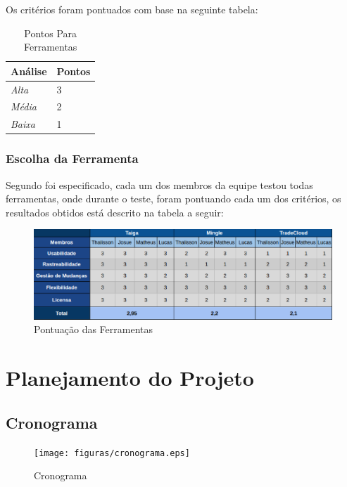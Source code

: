 Os critérios foram pontuados com base na seguinte tabela:

\begin{table}[!h]
	\centering
	\caption{Pontos Para Ferramentas}
	\label{my-label}
	\begin{tabular}{|l|l|}
	\hline
	\textbf{Análise} & \textbf{Pontos} \\ \hline
	\textit{Alta}    & 3               \\ \hline
	\textit{Média}   & 2               \\ \hline
	\textit{Baixa}   & 1               \\ \hline
	\end{tabular}
\end{table}

		\subsection{Escolha da Ferramenta}
		Segundo foi especificado, cada um dos membros da equipe testou todas ferramentas, onde durante o teste, foram pontuando cada
		 	um dos critérios, os resultados obtidos está descrito na tabela a seguir:


			\begin{figure}[!h]
			\centering
			\includegraphics[keepaspectratio=true,scale=0.6]{figuras/votos.eps}
			\caption{Pontuação das Ferramentas}
			\label{fig15}
		  \end{figure}

\chapter{Planejamento do Projeto}
	\section{Cronograma}

	\begin{figure}[!h]
		 \centering
		 \texttt{[image: figuras/cronograma.eps]}
		 \caption{Cronograma}
		 \label{fig15}
	\end{figure}

